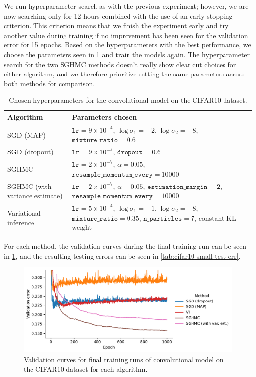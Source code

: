 We run hyperparameter search as with the previous experiment; however, we are now searching only for 12 hours combined with the use of an early-stopping criterion.
This criterion means that we finish the experiment early and try another value during training if no improvement has been seen for the validation error for 15 epochs.
Based on the hyperparameters with the best performance, we choose the parameters seen in \cref{tab:cifar10-small-hparams} and train the models again. 
The hyperparameter search for the two SGHMC methods doesn't really show clear cut choices for either algorithm, and we therefore prioritize setting the same parameters across both methods for comparison. 
\begin{table}[htbp]
    \centering
    \begin{tabular}{p{4cm}p{9cm}}
        \toprule
        Algorithm & Parameters chosen \\ \midrule
        SGD (MAP) & 
        $\texttt{lr}=9 \times 10^{-4}$, 
        $\log\sigma_1=-2$, 
        $\log\sigma_2=-8$, 
        $\texttt{mixture\_ratio}=0.6$ \\ \midrule
        SGD (dropout) & $\texttt{lr}=9\times 10^{-4}$,
        $\texttt{dropout}=0.6$ \\ \midrule
        SGHMC & $\texttt{lr}=2\times 10^{-7}$, $\alpha=0.05$, $\texttt{resample\_momentum\_every}=10000$ \\ \midrule
        SGHMC (with variance estimate) &  $\texttt{lr}= 2 \times 10^{-7}$, 
        $\alpha=0.05$,
        $\texttt{estimation\_margin}=2$, $\texttt{resample\_momentum\_every}=10000$ \\  \midrule
        Variational inference &    
        $\texttt{lr}=5 \times 10^{-4}$,
        $\log\sigma_1=-1$,
        $\log\sigma_2=-8$,
        $\texttt{mixture\_ratio}=0.35$,
        $\texttt{n\_particles}=7$, constant KL weight \\
        \bottomrule
    \end{tabular}
    \caption{Chosen hyperparameters for the convolutional model on the CIFAR10 dataset.}
    \label{tab:cifar10-small-hparams}
\end{table}
For each method, the validation curves during the final training run can be seen in \cref{fig:cifar-small-final-runs-val}, and the resulting testing errors can be seen in \cref{tab:cifar10-small-test-err}.
\begin{figure}[htbp]
    \centering
    \includegraphics[width=\linewidth]{Figures/cifar-small-final-runs-val.pdf}    
    \caption{Validation curves for final training runs of convolutional model on the CIFAR10 dataset for each algorithm.}
    \label{fig:cifar-small-final-runs-val}
\end{figure}
